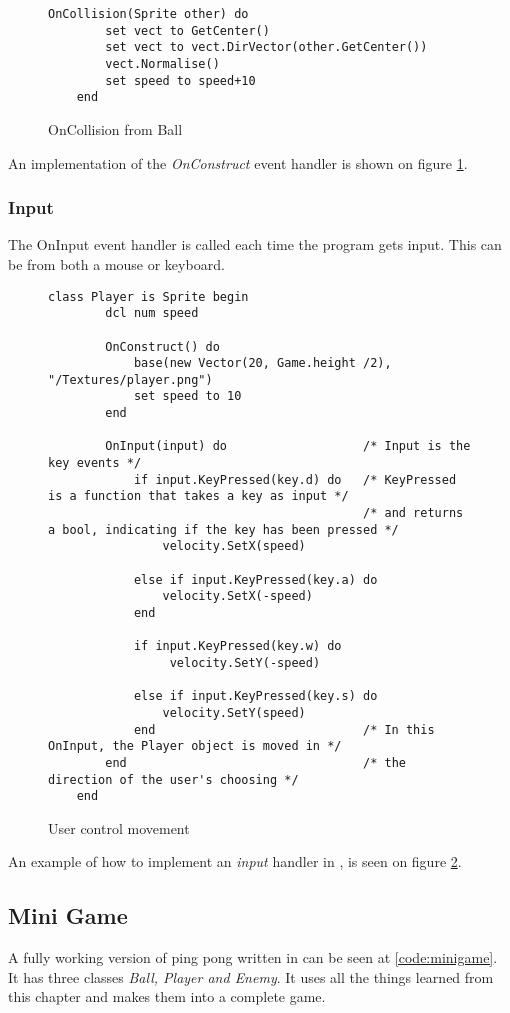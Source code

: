 \begin{figure}[H]
    \centering
    \begin{lstlisting}[style=gglang]
    OnCollision(Sprite other) do
        set vect to GetCenter()
        set vect to vect.DirVector(other.GetCenter())
        vect.Normalise()
        set speed to speed+10
    end
    \end{lstlisting}
    \caption{OnCollision from Ball\label{fig:collision}}
\end{figure}
An implementation of the \textit{OnConstruct} event handler is shown on figure \ref{fig:collision}.

\subsubsection{Input}
The OnInput event handler is called each time the program gets input. This can be from both a mouse or keyboard.

\begin{figure}[H]
    \centering
    \begin{lstlisting}[style=gglang]
    class Player is Sprite begin                     
        dcl num speed                               
        
        OnConstruct() do
            base(new Vector(20, Game.height /2), "/Textures/player.png")
            set speed to 10
        end
        
        OnInput(input) do                   /* Input is the key events */
            if input.KeyPressed(key.d) do   /* KeyPressed is a function that takes a key as input */
                                            /* and returns a bool, indicating if the key has been pressed */
                velocity.SetX(speed)             
            
            else if input.KeyPressed(key.a) do
                velocity.SetX(-speed)
            end
            
            if input.KeyPressed(key.w) do
                 velocity.SetY(-speed)
            
            else if input.KeyPressed(key.s) do
                velocity.SetY(speed)
            end                             /* In this OnInput, the Player object is moved in */ 
        end                                 /* the direction of the user's choosing */
    end
    \end{lstlisting}
    \caption{User control movement\label{fig:input}}
\end{figure}

An example of how to implement an \textit{input} handler in \lang{}, is seen on figure \ref{fig:input}.

\subsection{Mini Game}
\label{sec:miniGame}

A fully working version of ping pong written in \lang{} can be seen at \ref{code:minigame}. It has three classes \textit{Ball, Player and Enemy}. It uses all the things learned from this chapter and makes them into a complete game.